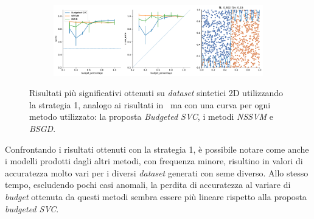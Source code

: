 \begin{figure}
\begin{subfigure}{.5\textwidth}
    \end{subfigure}
    \hfill
    \begin{subfigure}{.5\textwidth}
        \centering
        \includegraphics[width=\textwidth]{img/comp_old/15.pdf}
    \end{subfigure}
\caption[Risultati su \emph{dataset} sintetici utilizzando strategia 1 in confronto ad altri metodi.]{Risultati più significativi ottenuti su \emph{dataset} sintetici 2D utilizzando la strategia 1, analogo ai risultati in~ ma con una curva per ogni metodo utilizzato: la proposta \emph{Budgeted SVC}, i metodi \emph{NSSVM} e \emph{BSGD}.}
\label{fig:comp_old}
\end{figure}
Confrontando i risultati ottenuti con la strategia 1, è possibile notare come anche i modelli prodotti dagli altri metodi, con frequenza minore, risultino in valori di accuratezza molto vari per i diversi \emph{dataset} generati con seme diverso.
Allo stesso tempo, escludendo pochi casi anomali, la perdita di accuratezza al variare di \emph{budget} ottenuta da questi metodi sembra essere più lineare rispetto alla proposta \emph{budgeted SVC}.
